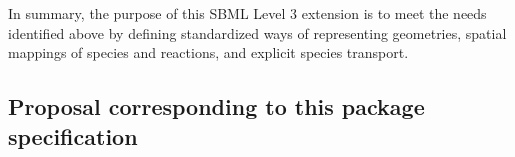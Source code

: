 In summary, the purpose of this SBML Level 3 extension is to meet the needs identified above by defining standardized ways of representing geometries, spatial mappings of species and reactions, and explicit species transport.









\pagebreak

\subsection{Proposal corresponding to this package specification}

